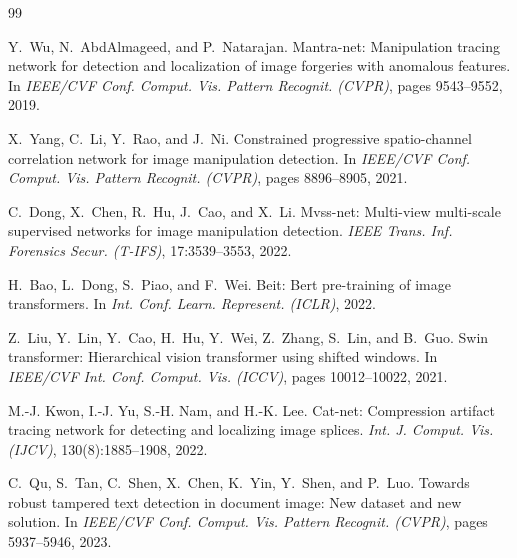 \documentclass[10pt,twocolumn,letterpaper]{article}
\begin{document}
\begin{thebibliography}{99}

Y.~Wu, N.~AbdAlmageed, and P.~Natarajan.
\newblock Mantra-net: Manipulation tracing network for detection and localization of image forgeries with anomalous features.
\newblock In \emph{IEEE/CVF Conf. Comput. Vis. Pattern Recognit. (CVPR)}, pages 9543--9552, 2019.

X.~Yang, C.~Li, Y.~Rao, and J.~Ni.
\newblock Constrained progressive spatio-channel correlation network for image manipulation detection.
\newblock In \emph{IEEE/CVF Conf. Comput. Vis. Pattern Recognit. (CVPR)}, pages 8896--8905, 2021.

C.~Dong, X.~Chen, R.~Hu, J.~Cao, and X.~Li.
\newblock Mvss-net: Multi-view multi-scale supervised networks for image manipulation detection.
\newblock \emph{IEEE Trans. Inf. Forensics Secur. (T-IFS)}, 17:3539--3553, 2022.

H.~Bao, L.~Dong, S.~Piao, and F.~Wei.
\newblock Beit: Bert pre-training of image transformers.
\newblock In \emph{Int. Conf. Learn. Represent. (ICLR)}, 2022.

Z.~Liu, Y.~Lin, Y.~Cao, H.~Hu, Y.~Wei, Z.~Zhang, S.~Lin, and B.~Guo.
\newblock Swin transformer: Hierarchical vision transformer using shifted windows.
\newblock In \emph{IEEE/CVF Int. Conf. Comput. Vis. (ICCV)}, pages 10012--10022, 2021.

M.-J. Kwon, I.-J. Yu, S.-H. Nam, and H.-K. Lee.
\newblock Cat-net: Compression artifact tracing network for detecting and localizing image splices.
\newblock \emph{Int. J. Comput. Vis. (IJCV)}, 130(8):1885--1908, 2022.

C.~Qu, S.~Tan, C.~Shen, X.~Chen, K.~Yin, Y.~Shen, and P.~Luo.
\newblock Towards robust tampered text detection in document image: New dataset and new solution.
\newblock In \emph{IEEE/CVF Conf. Comput. Vis. Pattern Recognit. (CVPR)}, pages 5937--5946, 2023.

\end{thebibliography}
\end{document}
